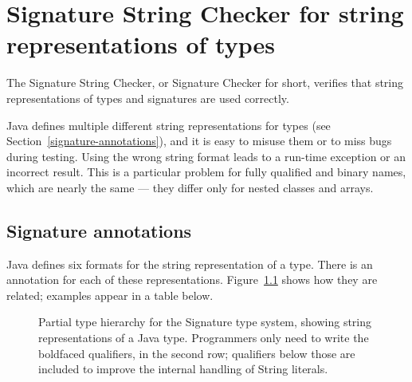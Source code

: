 \htmlhr
\chapter{Signature String Checker for string representations of types\label{signature-checker}}

The Signature String Checker, or Signature Checker for short, verifies that
string representations of types and signatures are used correctly.

Java defines multiple different string representations for types (see
Section~\ref{signature-annotations}), and it is easy to
misuse them or to miss bugs during testing.  Using the wrong string format
leads to a run-time exception or an incorrect result.  This is a particular
problem for fully qualified and binary names, which are nearly the same ---
they differ only for nested classes and arrays.


\section{Signature annotations\label{signature-annotations}}

Java defines six formats for the string representation of a type.
There is an annotation for each of these representations.
Figure~\ref{fig-signature-hierarchy} shows how they are related;
examples appear in a table below.

\begin{figure}
\caption{Partial type hierarchy for the Signature type system, showing
  string representations of a Java type.  Programmers only need to write
  the boldfaced qualifiers, in the second row; qualifiers below those are
  included to improve the internal handling of String literals.}
\label{fig-signature-hierarchy}
\end{figure}

